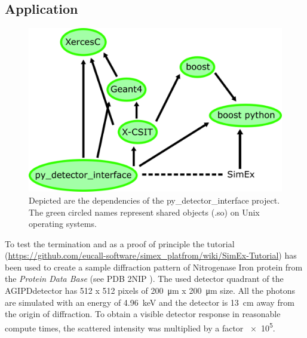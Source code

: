 \subsection{Application}
%
\begin{figure}
  \centering
  \includegraphics[width=.6\textwidth]{figures/Dependencies.png}
  \caption{Depicted are the dependencies of the py\_detector\_interface project. The green circled names represent shared objects (.so) on Unix operating systems.}\label{abb. dependent}
\end{figure}
%
To test the termination and as a proof of principle the tutorial
(\url{https://github.com/eucall-software/simex_platfrom/wiki/SimEx-Tutorial})
has been used to create a sample diffraction pattern of Nitrogenase Iron protein
from the \textit{Protein Data Base} (see PDB 2NIP \cite{PDB}). The used detector
quadrant of the \glqq AGIPD\grqq  detector has 512 x 512 pixels of
\SI{200}{\micro\metre} x \SI{200}{\micro\metre} size.
All the photons are simulated with an energy of \SI{4.96}{\kilo\electronvolt}
and the detector is \SI{13}{\centi\metre} away from  the origin of diffraction.
To obtain a visible detector response in reasonable compute times,
the scattered intensity was multiplied by a factor \num{e5}.
%
